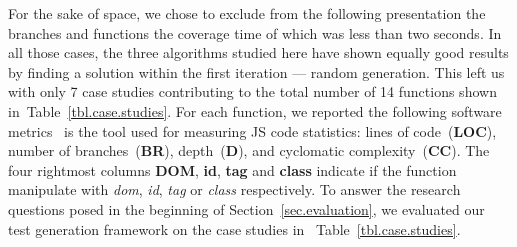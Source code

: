 \documentclass[sigconf,review]{acmart}
\begin{document}
For the sake of space, we chose to exclude from the following presentation the branches and functions the coverage time of which was less than two seconds. In all those cases, the three algorithms studied here have shown equally good results by finding a solution within the first iteration --- random generation. This left us with only 7 case studies contributing to the total number of 14 functions  shown in~Table~\ref{tbl.case.studies}. For each function, we reported the following software metrics~\cite{jsmeter} is the tool used for measuring JS code statistics: lines of code~(\textbf{LOC}), number of branches~(\textbf{BR}), depth~(\textbf{D}), and cyclomatic complexity~(\textbf{CC}). The four rightmost columns \textbf{DOM}, \textbf{id}, \textbf{tag} and \textbf{class} indicate if the function manipulate with \emph{dom}, \emph{id}, \emph{tag} or \emph{class} respectively. To answer the research questions posed in the beginning of Section~\ref{sec.evaluation}, we evaluated our test generation framework on the case studies in ~Table~\ref{tbl.case.studies}. 
       
\end{document}
